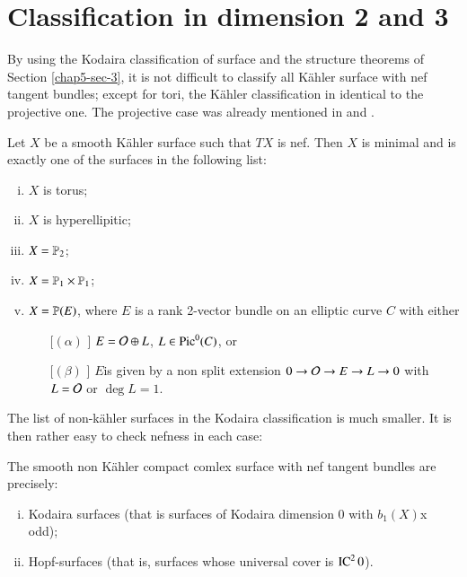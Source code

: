 \section{Classification in dimension 2 and 3}\label{chap5-sec-4}

By using the Kodaira classification of surface and the structure theorems of Section \ref{chap5-sec-3}, it is not difficult to classify all K\"ahler surface with nef tangent bundles; except for tori, the K\"ahler classification in identical to the projective one. The projective case was already mentioned in \cite{chap5-keyCP91} and \cite{chap5-keyZh90}.
    \begin{secthm}
    Let $X$ be a smooth K\"ahler surface such that $TX$ is nef. Then $X$ is minimal and is exactly one of the surfaces in the following list:
    \begin{enumerate}[(i)]
    \item $X$ is torus;\label{chap5-enum-thm-(1)}
    \item $X$ is hyperellipitic;\label{chap5-enum-thm-(ii)}
    \item $X= \mathbb{P}_{2}$;\label{chap5-enum-thm-(iii)}
    \item $X= \mathbb{P}_{1} \times \mathbb{P}_{1}$;\label{chap5-enum-thm-(iv)}
    \item $X = \mathbb{P}(E)$, where $E$ is a rank 2-vector bundle on an elliptic curve $C$ with either \label{chap5-enum-thm-(v)}
        \begin{enumerate}
        \item [[$(\alpha)$]] $E= \mathcal{O} \oplus L$, $L \in \operatorname{Pic}^{0}(C)$, or
        \item [[$(\beta)$]] $E$\pageoriginale is given by a non split extension $0 \rightarrow \mathcal{O} \rightarrow E \rightarrow L \rightarrow 0$ with $L = \mathcal{O}$ or $\deg L = 1$.
        \end{enumerate}
    \end{enumerate}
\end{secthm}

The list of non-k\"ahler surfaces in the Kodaira classification is much smaller. It is then rather easy to check nefness in each case:

\begin{secthm}\label{chap5-thm-4.2}
The smooth non K\"ahler compact comlex surface with nef tangent bundles are precisely:
    \begin{enumerate}[(i)]
        \item Kodaira surfaces (that is surfaces of Kodaira dimension 0 with $b_{1}(X)$x
        odd);\label{chap5-enum-thm(4.2)-(i)}
       \item Hopf-surfaces (that is, surfaces whose universal cover is $\operatorname{IC}^{2}{0}$).\label{chap5-enum-thm(4.2)-(ii)} 
    \end{enumerate}
\end{secthm}

